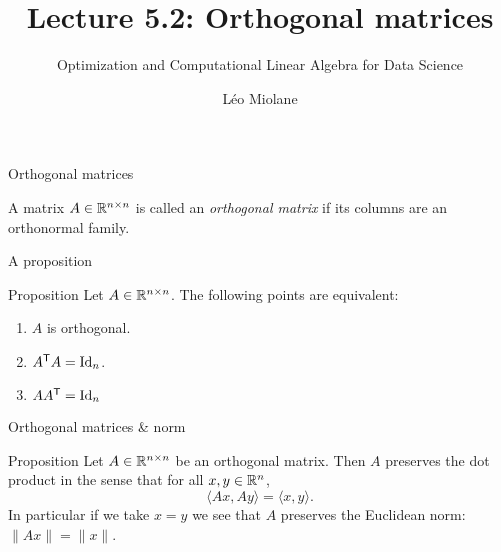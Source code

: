 \documentclass{beamer}
\title{Lecture 5.2: Orthogonal matrices}
\subtitle{Optimization and Computational Linear Algebra for Data Science}
\author{Léo Miolane}
\date{}
\begin{document}
\setcounter{showProgressBar}{0}
\setcounter{showSlideNumbers}{0}

\frame{\titlepage}
\setcounter{framenumber}{0}
\setcounter{showSlideNumbers}{1}

\begin{frame}[t]{Orthogonal matrices}
	\grid

	\begin{definition}
		A matrix $A \in \mathbb{R}^{n \times n}$ is called an \emph{orthogonal matrix} if its columns are an orthonormal family.
	\end{definition}
\end{frame}

\begin{frame}[t]{A proposition}
	\grid

	\vspace{-0.4cm}
	\begin{block}{Proposition}
		Let $A \in \mathbb{R}^{n \times n}$. The following points are equivalent:
		\begin{enumerate}
			\item $A$ is orthogonal.
			\item $A^{{\sf T}} A = {{\rm Id}}_n$.
			\item $A A^{{\sf T}} = {{\rm Id}}_n$
		\end{enumerate}
	\end{block}
\end{frame}

\begin{frame}[t]{Orthogonal matrices \& norm}
	\grid

	\vspace{-0.4cm}
	\begin{block}{Proposition}
	Let $A \in \mathbb{R}^{n \times n}$ be an orthogonal matrix. Then $A$ preserves the dot product in the sense that for all $x,y \in \mathbb{R}^n$,
	$$
	\langle Ax, Ay \rangle = \langle x,y\rangle.
	$$
	In particular if we take $x=y$ we see that $A$ preserves the Euclidean norm: $\|Ax\| = \|x\|$.
\end{block}
\end{frame}
\end{document}
